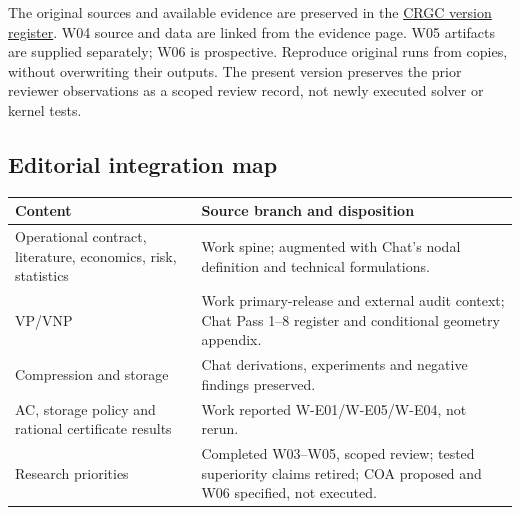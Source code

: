 \documentclass[11pt,letterpaper]{article}
\begin{document}
The original sources and available evidence are preserved in the \href{https://chatgpt.com/space/page_c22eca223fc88191a109ba88e518d954}{CRGC version register}. W04 source and data are linked from the evidence page. W05 artifacts are supplied separately; W06 is prospective. Reproduce original runs from copies, without overwriting their outputs. The present version preserves the prior reviewer observations as a scoped review record, not newly executed solver or kernel tests.

\subsection{Editorial integration map}
\begin{longtable}{P{.38\linewidth}P{.53\linewidth}}
\toprule Content & Source branch and disposition\\\midrule\endhead
Operational contract, literature, economics, risk, statistics & Work spine; augmented with Chat's nodal definition and technical formulations.\\
VP/VNP & Work primary-release and external audit context; Chat Pass 1--8 register and conditional geometry appendix.\\
Compression and storage & Chat derivations, experiments and negative findings preserved.\\
AC, storage policy and rational certificate results & Work reported W-E01/W-E05/W-E04, not rerun.\\
Research priorities & Completed W03--W05, scoped review; tested superiority claims retired; COA proposed and W06 specified, not executed.\\
\bottomrule
\end{longtable}
\end{document}
